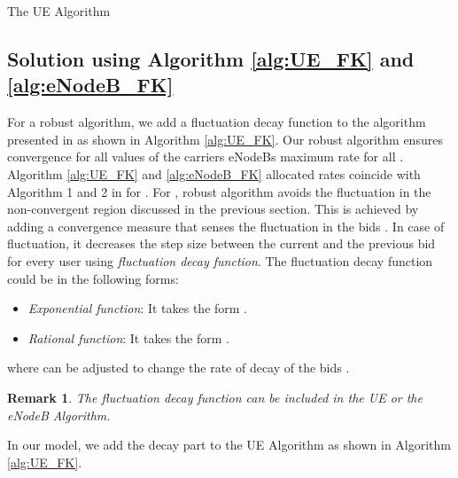 \documentclass[journal]{IEEEtran} 		\usepackage{amsmath,amssymb}
\newtheorem{rem}[thm]{Remark}
\begin{document}
\begin{algorithm}[tb]
\caption{The  UE Algorithm}\label{alg:UE_FK}
\begin{algorithmic}
\LOOP
	 
	\ELSE
		\FOR{}
		    \STATE{}
		    \STATE{}
		    \STATE {}
		    \IF{}
		    \ENDIF
{}
\IF {} \STATE {}
		    \ENDIF
{}
		\ENDFOR
	\ENDIF
\ENDLOOP
\end{algorithmic}
\end{algorithm}
\subsection{Solution using Algorithm \ref{alg:UE_FK} and \ref{alg:eNodeB_FK}}\label{sec:conv_solution}
For a robust algorithm, we add a fluctuation decay function to the algorithm presented in \cite{Ahmed_Utility4} as shown in Algorithm \ref{alg:UE_FK}. Our robust algorithm ensures convergence for all values of the carriers eNodeBs maximum rate  for all . Algorithm \ref{alg:UE_FK} and \ref{alg:eNodeB_FK} allocated rates coincide with Algorithm 1 and 2 in \cite{Ahmed_Utility4} for . For , robust algorithm avoids the fluctuation in the non-convergent region discussed in the previous section. This is achieved by adding a convergence measure  that senses the fluctuation in the bids . In case of fluctuation, it decreases the step size between the current and the previous bid  for every user  using \textit{fluctuation decay function}. The
fluctuation decay function could be in the following forms:
\begin{itemize}
\item \textit{Exponential function}: It takes the form .
\item \textit{Rational function}: It takes the form .
\end{itemize}
where  can be adjusted to change the rate of decay of the bids . 

\begin{rem}
The fluctuation decay function can be included in the UE or the eNodeB Algorithm.
\end{rem}
In our model, we add the decay part to the UE Algorithm as shown in Algorithm \ref{alg:UE_FK}.
\end{document}

